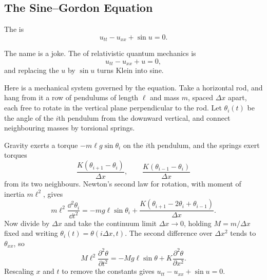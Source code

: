 \subsection{The Sine--Gordon Equation}

\begin{definition}
	The  is
	$$
	u_{tt} - u_{xx} + \sin u = 0.
	$$
\end{definition}

The name is a joke. The  of relativistic quantum mechanics is
$$
u_{tt} - u_{xx} + u = 0,
$$
and replacing the $u$ by $\sin u$ turns Klein into sine.

\begin{example}
	Here is a mechanical system governed by the equation. Take a horizontal rod, and hang from it a row of pendulums of length $\ell$ and mass $m$, spaced $\Delta x$ apart, each free to rotate in the vertical plane perpendicular to the rod. Let $\theta_i(t)$ be the angle of the $i$th pendulum from the downward vertical, and connect neighbouring masses by torsional springs.
	\begin{center}
	\end{center}
	Gravity exerts a torque $-m\ell g\sin\theta_i$ on the $i$th pendulum, and the springs exert torques
	$$
	\frac{K(\theta_{i+1}-\theta_i)}{\Delta x}, \qquad \frac{K(\theta_{i-1}-\theta_i)}{\Delta x}
	$$
	from its two neighbours. Newton's second law for rotation, with moment of inertia $m\ell^2$, gives
	$$
	m\ell^2\frac{\dd^2\theta_i}{\dd t^2} = -mg\ell\sin\theta_i + \frac{K\left(\theta_{i+1} - 2\theta_i + \theta_{i-1}\right)}{\Delta x}.
	$$
	Now divide by $\Delta x$ and take the continuum limit $\Delta x\to0$, holding $M = m/\Delta x$ fixed and writing $\theta_i(t) = \theta(i\Delta x, t)$. The second difference over $\Delta x^2$ tends to $\theta_{xx}$, so
	$$
	M\ell^2\frac{\partial^2\theta}{\partial t^2} = -Mg\ell\sin\theta + K\frac{\partial^2\theta}{\partial x^2}.
	$$
	Rescaling $x$ and $t$ to remove the constants gives $u_{tt} - u_{xx} + \sin u = 0$.
\end{example}

